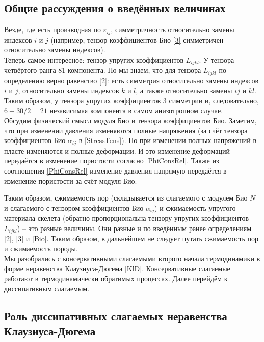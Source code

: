 \documentclass[main.tex]{subfiles}
\begin{document}
\subsection{Общие рассуждения о введённых величинах}
Везде, где есть производная по $\varepsilon_{ij}$, симметричность относительно замены индексов $i$ и $j$ (например, тензор коэффициентов Био \eqref{3} симметричен относительно замены индексов).\\

Теперь самое интересное: тензор упругих коэффициентов $L_{ijkl}$. У тензора четвёртого ранга 81 компонента. Но мы знаем, что для тензора $L_{ijkl}$ по определению верно равенство \eqref{2}: есть симметрия относительно замены индексов $i$ и $j$, относительно замены индексов $k$ и $l$, а также относительно замены $ij$ и $kl$. Таким образом, у тензора упругих коэффициентов 3 симметрии и, следовательно, $6+30/2=21$ независимая компонента в самом анизотропном случае.\\

Обсудим физический смысл модуля Био и тензора коэффициентов Био. Заметим, что при изменении давления изменяются полные напряжения (за счёт тензора коэффициентов Био $\alpha_{ij}$ в \eqref{StressTens}). Но при изменении полных напряжений  в пласте изменяются и полные деформации. И это изменение деформаций передаётся в изменение пористости согласно \eqref{PhiConsRel}. Также из соотношения \eqref{PhiConsRel} изменение давления напрямую передаётся в изменение пористости за счёт модуля Био.

Таким образом, сжимаемость пор (складывается из слагаемого с модулем Био $N$ и слагаемого с тензором коэффициентов Био $\alpha_{ij}$) и сжимаемость упругого материала скелета (обратно пропорциональна тензору упругих коэффициентов $L_{ijkl}$) -- это разные величины. Они разные и по введённым ранее определениям \eqref{2}, \eqref{3} и \eqref{Bio}. Таким образом, в дальнейшем не следует путать сжимаемость пор и сжимаемость породы. \\

Мы разобрались с консервативными слагаемыми второго начала термодинамики в форме неравенства Клаузиуса-Дюгема \eqref{KlD}. Консервативные слагаемые работают в термодинамически обратимых процессах. Далее перейдём к диссипативным слагаемым.

\subsection{Роль диссипативных слагаемых неравенства Клаузиуса-Дюгема}
\end{document}
